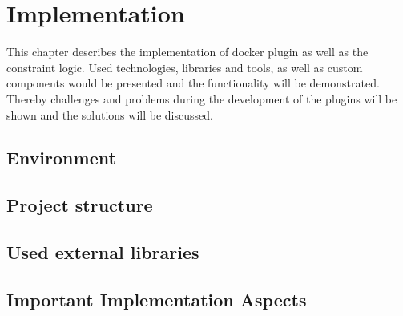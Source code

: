 \acresetall

\chapter{Implementation}\label{chapter:implementation}
This chapter describes the implementation of docker plugin as well as the constraint logic.
Used technologies, libraries and tools, as well as custom components would be presented and the functionality will be demonstrated.
Thereby challenges and problems during the development of the plugins will be shown and the solutions will be discussed.

\section{Environment}
\doit

\section{Project structure}
\doit

\section{Used external libraries}
\doit

\section{Important Implementation Aspects}

\doit

